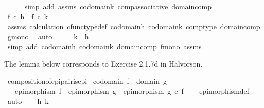 \begin{isabellebody}
\ \ \ \ \isamarkupfalse%
\ {\isacharparenleft}{\kern0pt}simp\ add{\isacharcolon}{\kern0pt}\ assms\ codomain{\isacharunderscore}{\kern0pt}k\ comp{\isacharunderscore}{\kern0pt}associative\ domain{\isacharunderscore}{\kern0pt}comp{\isacharparenright}{\kern0pt}\isanewline
\ \ \isamarkupfalse%
\ \isamarkupfalse%
\ {\isachardoublequoteopen}f\ {\isasymcirc}\isactrlsub c\ h\ {\isacharequal}{\kern0pt}\ f\ {\isasymcirc}\isactrlsub c\ k{\isachardoublequoteclose}\isanewline
\ \ \ \ \isamarkupfalse%
\ assms\ calculation\ cfunc{\isacharunderscore}{\kern0pt}type{\isacharunderscore}{\kern0pt}def\ codomain{\isacharunderscore}{\kern0pt}h\ codomain{\isacharunderscore}{\kern0pt}k\ comp{\isacharunderscore}{\kern0pt}type\ domain{\isacharunderscore}{\kern0pt}comp\ g{\isacharunderscore}{\kern0pt}mono\ \isamarkupfalse%
\ auto\isanewline
\ \ \isamarkupfalse%
\ \isamarkupfalse%
\ {\isachardoublequoteopen}k\ {\isacharequal}{\kern0pt}\ h{\isachardoublequoteclose}\isanewline
\ \ \ \ \isamarkupfalse%
\ {\isacharparenleft}{\kern0pt}simp\ add{\isacharcolon}{\kern0pt}\ codomain{\isacharunderscore}{\kern0pt}h\ codomain{\isacharunderscore}{\kern0pt}k\ domain{\isacharunderscore}{\kern0pt}comp\ f{\isacharunderscore}{\kern0pt}mono\ assms{\isacharparenright}{\kern0pt}\isanewline
{}\isamarkupfalse%
%
\endisatagproof
{\isafoldproof}%
%
\isadelimproof
%
\endisadelimproof
%
\begin{isamarkuptext}%
The lemma below corresponds to Exercise 2.1.7d in Halvorson.%
\end{isamarkuptext}\isamarkuptrue%
\isamarkupfalse%
\ composition{\isacharunderscore}{\kern0pt}of{\isacharunderscore}{\kern0pt}epi{\isacharunderscore}{\kern0pt}pair{\isacharunderscore}{\kern0pt}is{\isacharunderscore}{\kern0pt}epi{\isacharcolon}{\kern0pt}\isanewline
{}\ {\isachardoublequoteopen}codomain\ f\ {\isacharequal}{\kern0pt}\ domain\ g{\isachardoublequoteclose}\isanewline
\ \ \ {\isachardoublequoteopen}epimorphism\ f\ {\isasymLongrightarrow}\ epimorphism\ g\ {\isasymLongrightarrow}\ epimorphism\ {\isacharparenleft}{\kern0pt}g\ {\isasymcirc}\isactrlsub c\ f{\isacharparenright}{\kern0pt}{\isachardoublequoteclose}\isanewline
%
\isadelimproof
\ \ %
\endisadelimproof
%
\isatagproof
{}\isamarkupfalse%
\ epimorphism{\isacharunderscore}{\kern0pt}def\isanewline
{}\isamarkupfalse%
\ auto\isanewline
\ \ \isamarkupfalse%
\ h\ k\isanewline

\end{isabellebody}
